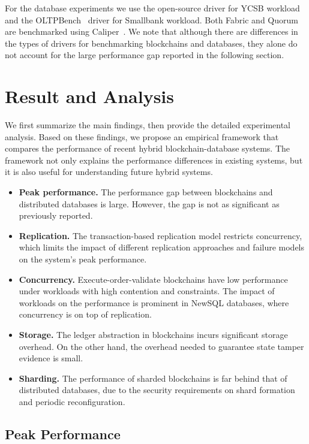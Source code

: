 For the database experiments we use the open-source driver for YCSB workload~\cite{web:ycsb} and 
the OLTPBench~\cite{difallah2013oltp} driver for Smallbank workload.  Both Fabric and Quorum are
benchmarked using Caliper~\cite{web:caliper}. We note that although there are differences in the types of
drivers for benchmarking blockchains and databases, they alone do not account for the large performance gap
reported in the following section. 

\section{Result and Analysis}
\label{ch:twin:exp}
We first summarize the main findings, then provide the detailed experimental analysis. Based on these findings,
we propose an empirical framework that compares the performance of recent hybrid blockchain-database systems.
The framework not only explains the performance differences in existing systems, but it is also useful for
understanding future hybrid systems.

\begin{itemize}
  \item \textbf{Peak performance.} The performance gap between blockchains and distributed databases is large. However, the gap is not as significant as previously reported.
  \item \textbf{Replication. }
    The transaction-based replication model restricts concurrency, which limits the impact of different
	replication approaches and failure models on the system's peak performance. 
  \item \textbf{Concurrency.} Execute-order-validate blockchains have low performance under workloads with high contention and constraints.
  The impact of workloads on the performance is prominent in NewSQL databases, where concurrency is
  on top of replication.
  \item \textbf{Storage. } The ledger abstraction in blockchains incurs significant storage overhead. On the
  other hand, the overhead needed to guarantee state tamper evidence is small.
  \item \textbf{Sharding. } The performance of sharded blockchains is far behind that of distributed
  databases, due to the security requirements on shard formation and periodic reconfiguration.
\end{itemize}

\subsection {Peak Performance}
